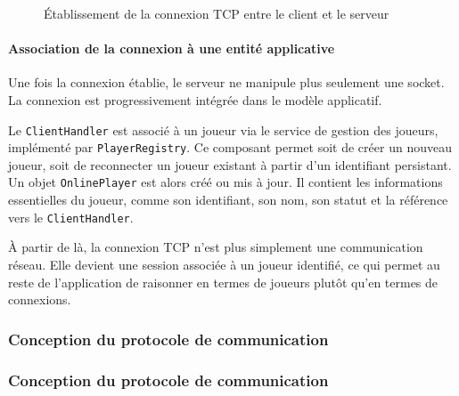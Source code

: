 \documentclass[a4paper]{article}
\begin{document}
\begin{figure}[H]
\centering
{}
\caption{Établissement de la connexion TCP entre le client et le serveur}
\label{fig:tcp_etablissement}
\end{figure}

\paragraph{Association de la connexion à une entité applicative}

Une fois la connexion établie, le serveur ne manipule plus seulement une socket. La connexion est progressivement intégrée dans le modèle applicatif.

Le \texttt{ClientHandler} est associé à un joueur via le service de gestion des joueurs, implémenté par \texttt{PlayerRegistry}. Ce composant permet soit de créer un nouveau joueur, soit de reconnecter un joueur existant à partir d’un identifiant persistant. Un objet \texttt{OnlinePlayer} est alors créé ou mis à jour. Il contient les informations essentielles du joueur, comme son identifiant, son nom, son statut et la référence vers le \texttt{ClientHandler}.

À partir de là, la connexion TCP n’est plus simplement une communication réseau. Elle devient une session associée à un joueur identifié, ce qui permet au reste de l’application de raisonner en termes de joueurs plutôt qu’en termes de connexions.

\subsubsection{Conception du protocole de communication}

\subsubsection{Conception du protocole de communication}
\end{document}
